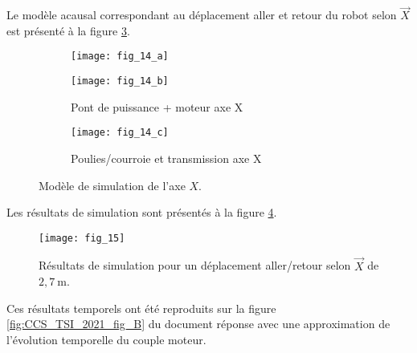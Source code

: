 Le modèle acausal correspondant au déplacement aller et retour du robot selon $\vec{X}$ est présenté à la figure \ref{fig:CCS_TSI_2021_fig_14}.


\begin{figure}
\centering
   \begin{subfigure}[b]{.9\textwidth}
    \centering
    \texttt{[image: fig\_14\_a]}
      \end{subfigure}
    
    \begin{subfigure}[b]{0.45\textwidth}
    \centering
    \texttt{[image: fig\_14\_b]}
    \caption{Pont de puissance + moteur axe X \label{fig:CCS_TSI_2021_fig_14_b}}
    \end{subfigure}
    \begin{subfigure}[b]{0.45\textwidth}
    \centering
    \texttt{[image: fig\_14\_c]}
    \caption{Poulies/courroie et transmission axe X
\label{fig:CCS_TSI_2021_fig_14_c}}
    \end{subfigure}

\caption{\label{fig:CCS_TSI_2021_fig_14}Modèle de simulation de l'axe $X$.}
\end{figure}


Les résultats de simulation sont présentés à la figure \ref{fig:CCS_TSI_2021_fig_15}.
\begin{figure}
\centering
\texttt{[image: fig\_15]}
\caption{\label{fig:CCS_TSI_2021_fig_15}Résultats de simulation pour un déplacement aller/retour selon $\vec{X}$ de $2,7 \mathrm{~m}$.}
\end{figure}
Ces résultats temporels ont été reproduits sur la figure \ref{fig:CCS_TSI_2021_fig_B} du document réponse avec une approximation de l'évolution temporelle du couple moteur.



